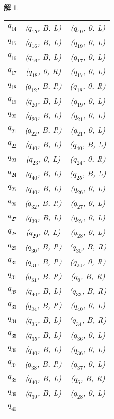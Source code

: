 \documentclass[12pt,onecolumn]{article}
\theoremstyle{plain}
\newtheorem*{solution}{解}
\begin{document}
\begin{solution}
\begin{table}[H]
\begin{tabular}{l|cc}
 $q_{14}$ & ($q_{15}$, B, L)         & ($q_{40}$, 0, L) \\
 $q_{15}$ & ($q_{16}$, B, L)         & ($q_{19}$, 0, L) \\
 $q_{16}$ & ($q_{16}$, B, L)         & ($q_{17}$, 0, L) \\
 $q_{17}$ & ($q_{18}$, 0, R)         & ($q_{17}$, 0, L) \\
 $q_{18}$ & ($q_{12}$, B, R)         & ($q_{18}$, 0, R) \\
 $q_{19}$ & ($q_{20}$, B, L)         & ($q_{19}$, 0, L) \\
 $q_{20}$ & ($q_{20}$, B, L)         & ($q_{21}$, 0, L) \\
 $q_{21}$ & ($q_{22}$, B, R)         & ($q_{21}$, 0, L) \\
 $q_{22}$ & ($q_{40}$, B, L)         & ($q_{40}$, B, L) \\
 $q_{23}$ & ($q_{23}$, 0, L)         & ($q_{24}$, 0, R) \\
 $q_{24}$ & ($q_{40}$, B, L)         & ($q_{25}$, B, L) \\
 $q_{25}$ & ($q_{40}$, B, L)         & ($q_{26}$, 0, L) \\
 $q_{26}$ & ($q_{32}$, B, R)         & ($q_{27}$, 0, L) \\
 $q_{27}$ & ($q_{39}$, B, L)         & ($q_{27}$, 0, L) \\
 $q_{28}$ & ($q_{29}$, 0, L)         & ($q_{28}$, 0, L) \\
 $q_{29}$ & ($q_{30}$, B, R)         & ($q_{30}$, B, R) \\
 $q_{30}$ & ($q_{31}$, B, R)         & ($q_{30}$, 0, R) \\
 $q_{31}$ & ($q_{31}$, B, R)         & ($q_{6}$, B, R)  \\
 $q_{32}$ & ($q_{40}$, B, L)         & ($q_{33}$, B, R) \\
 $q_{33}$ & ($q_{34}$, B, R)         & ($q_{40}$, 0, L) \\
 $q_{34}$ & ($q_{35}$, B, L)         & ($q_{34}$, B, R) \\
 $q_{35}$ & ($q_{35}$, B, L)         & ($q_{36}$, 0, L) \\
 $q_{36}$ & ($q_{40}$, B, L)         & ($q_{36}$, 0, L) \\
 $q_{37}$ & ($q_{38}$, B, R)         & ($q_{37}$, 0, L) \\
 $q_{38}$ & ($q_{40}$, B, L)         & ($q_{6}$, B, R)  \\
 $q_{39}$ & ($q_{39}$, B, L)         & ($q_{28}$, 0, L) \\
 $q_{40}$ & ---                      & ---
 \end{tabular}
 \end{table}

\end{solution}
\end{document}
